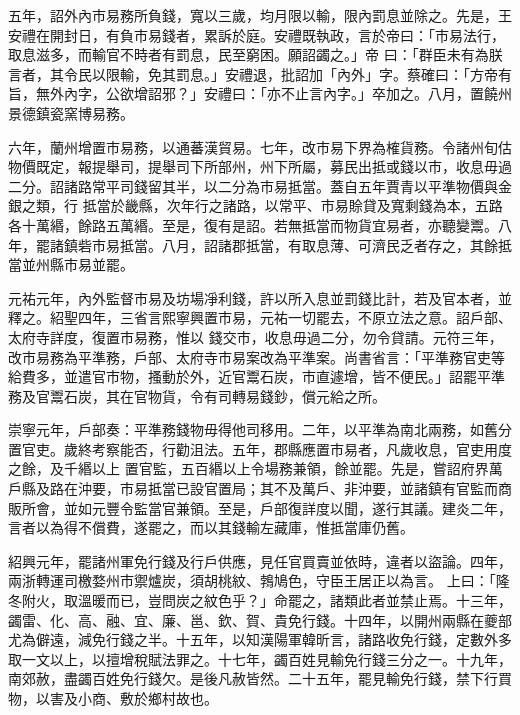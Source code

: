 \begin{pinyinscope}
 五年，詔外內市易務所負錢，寬以三歲，均月限以輸，限內罰息並除之。先是，王安禮在開封日，有負市易錢者，累訴於庭。安禮既執政，言於帝曰：「市易法行，取息滋多，而輸官不時者有罰息，民至窮困。願詔蠲之。」帝
 曰：「群臣未有為朕言者，其令民以限輸，免其罰息。」安禮退，批詔加「內外」字。蔡確曰：「方帝有旨，無外內字，公欲增詔邪？」安禮曰：「亦不止言內字。」卒加之。八月，置饒州景德鎮瓷窯博易務。



 六年，蘭州增置市易務，以通蕃漢貿易。七年，改市易下界為榷貨務。令諸州旬估物價既定，報提舉司，提舉司下所部州，州下所屬，募民出抵或錢以市，收息毋過二分。詔諸路常平司錢留其半，以二分為市易抵當。蓋自五年賈青以平準物價與金銀之類，行
 抵當於畿縣，次年行之諸路，以常平、市易賒貸及寬剩錢為本，五路各十萬緡，餘路五萬緡。至是，復有是詔。若無抵當而物貨宜易者，亦聽變鬻。八年，罷諸鎮砦市易抵當。八月，詔諸郡抵當，有取息薄、可濟民乏者存之，其餘抵當並州縣市易並罷。



 元祐元年，內外監督市易及坊場凈利錢，許以所入息並罰錢比計，若及官本者，並釋之。紹聖四年，三省言熙寧興置市易，元祐一切罷去，不原立法之意。詔戶部、太府寺詳度，復置市易務，惟以
 錢交市，收息毋過二分，勿令貸請。元符三年，改市易務為平準務，戶部、太府寺市易案改為平準案。尚書省言：「平準務官吏等給費多，並遣官市物，搔動於外，近官鬻石炭，市直遽增，皆不便民。」詔罷平準務及官鬻石炭，其在官物貨，令有司轉易錢鈔，償元給之所。



 崇寧元年，戶部奏：平準務錢物毋得他司移用。二年，以平準為南北兩務，如舊分置官吏。歲終考察能否，行勸沮法。五年，郡縣應置市易者，凡歲收息，官吏用度之餘，及千緡以上
 置官監，五百緡以上令場務兼領，餘並罷。先是，嘗詔府界萬戶縣及路在沖要，市易抵當已設官置局；其不及萬戶、非沖要，並諸鎮有官監而商販所會，並如元豐令監當官兼領。至是，戶部復詳度以聞，遂行其議。建炎二年，言者以為得不償費，遂罷之，而以其錢輸左藏庫，惟抵當庫仍舊。



 紹興元年，罷諸州軍免行錢及行戶供應，見任官買賣並依時，違者以盜論。四年，兩浙轉運司檄婺州市禦爐炭，須胡桃紋、鵓鳩色，守臣王居正以為言。
 上曰：「隆冬附火，取溫暖而已，豈問炭之紋色乎？」命罷之，諸類此者並禁止焉。十三年，蠲雷、化、高、融、宜、廉、邕、欽、賀、貴免行錢。十四年，以開州兩縣在夔部尤為僻遠，減免行錢之半。十五年，以知漢陽軍韓昕言，諸路收免行錢，定數外多取一文以上，以擅增稅賦法罪之。十七年，蠲百姓見輸免行錢三分之一。十九年，南郊赦，盡蠲百姓免行錢欠。是後凡赦皆然。二十五年，罷見輸免行錢，禁下行買物，以害及小商、敷於鄉村故也。




\end{pinyinscope}
